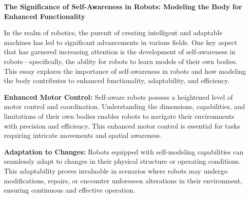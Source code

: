 
\textbf{The Significance of Self-Awareness in Robots: Modeling the Body for Enhanced Functionality}

In the realm of robotics, the pursuit of creating intelligent and adaptable machines has led to significant advancements in various fields. One key aspect that has garnered increasing attention is the development of self-awareness in robots—specifically, the ability for robots to learn models of their own bodies. This essay explores the importance of self-awareness in robots and how modeling the body contributes to enhanced functionality, adaptability, and efficiency.

\textbf{Enhanced Motor Control:} Self-aware robots possess a heightened level of motor control and coordination. Understanding the dimensions, capabilities, and limitations of their own bodies enables robots to navigate their environments with precision and efficiency. This enhanced motor control is essential for tasks requiring intricate movements and spatial awareness.

\textbf{Adaptation to Changes:} Robots equipped with self-modeling capabilities can seamlessly adapt to changes in their physical structure or operating conditions. This adaptability proves invaluable in scenarios where robots may undergo modifications, repairs, or encounter unforeseen alterations in their environment, ensuring continuous and effective operation.

